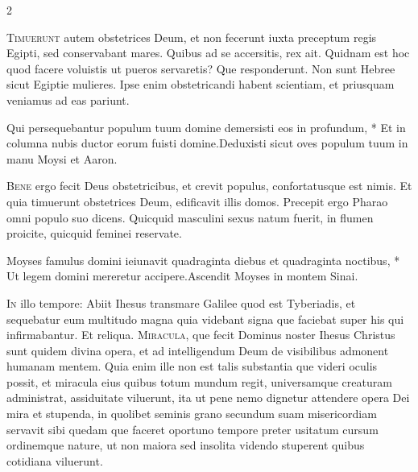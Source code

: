 \begin{multicols*}{2}
\begin{responsory}
\end{responsory}%
\lettrine[lines=2]{\zallmancaps \color{Blue} T}{imuerunt} autem obstetrices Deum, et non fecerunt iuxta preceptum regis Egipti, sed conservabant mares. Quibus ad se accersitis, rex ait. Quidnam est hoc quod facere voluistis ut pueros servaretis? Que responderunt. Non sunt Hebree sicut Egiptie mulieres. Ipse enim obstetricandi habent scientiam, et priusquam veniamus ad eas pariunt.
\begin{responsory}
{Qui persequebantur populum tuum domine demersisti eos in profundum, * Et in columna nubis ductor eorum fuisti domine.}{Deduxisti sicut oves populum tuum in manu Moysi et Aaron.}
\end{responsory}%
\lettrine[lines=2]{\zallmancaps \color{Red} B}{ene} ergo fecit Deus obstetricibus, et crevit populus, confortatusque est nimis. Et quia timuerunt obstetrices
Deum, edificavit illis domos. Precepit ergo Pharao omni populo suo dicens. Quicquid masculini sexus natum fuerit, in flumen proicite, quicquid feminei reservate.
\begin{responsory-doxology}
{Moyses famulus domini ieiunavit quadraginta diebus et quadraginta noctibus, * Ut legem domini mereretur accipere.}{Ascendit Moyses in montem Sinai.}
\end{responsory-doxology}%
\lettrine[lines=2]{\zallmancaps \color{Blue} I}{n} illo tempore: Abiit Ihesus transmare Galilee quod est Tyberiadis, et sequebatur eum multitudo magna quia videbant signa que faciebat super his qui infirmabantur. Et reliqua.
\lettrine[lines=2]{\zallmancaps \color{Red} M}{iracula}, que fecit Dominus noster Ihesus Christus sunt quidem divina opera, et ad intelligendum Deum de visibilibus admonent humanam mentem. Quia enim ille non est talis substantia que videri oculis possit, et miracula eius quibus totum mundum regit, universamque creaturam administrat, assiduitate viluerunt, ita ut pene nemo dignetur attendere opera Dei mira et stupenda, in quolibet seminis grano secundum suam misericordiam servavit sibi quedam que faceret oportuno tempore preter usitatum cursum ordinemque nature, ut non maiora sed insolita videndo stuperent quibus cotidiana viluerunt.
\begin{responsory}

\end{responsory}
\end{multicols*}
